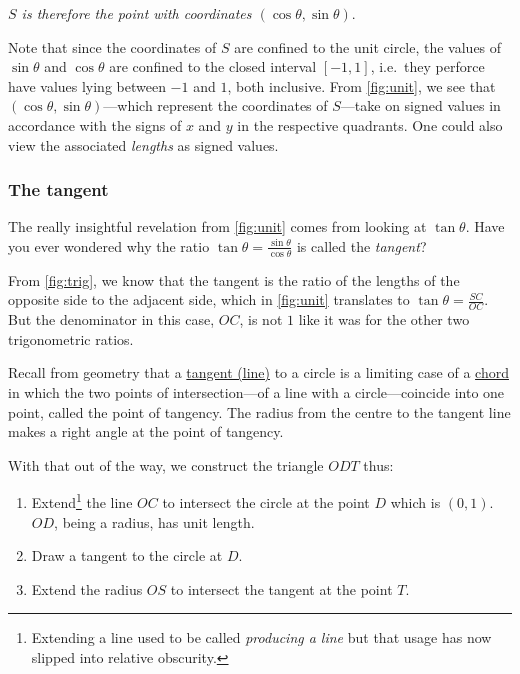 \documentclass[
  a4paper,
]{article}
\providecommand{\tightlist}{%
  \setlength{\itemsep}{0pt}\setlength{\parskip}{0pt}}
\begin{document}
\emph{\(S\) is therefore the point with coordinates
\((\cos\theta, \sin\theta)\)}.

Note that since the coordinates of \(S\) are confined to the unit
circle, the values of \(\sin\theta\) and \(\cos\theta\) are confined to
the closed interval \([-1, 1]\), i.e.~they perforce have values lying
between \(-1\) and \(1\), both inclusive. From \cref{fig:unit}, we see
that \((\cos\theta, \sin\theta)\)---which represent the coordinates of
\(S\)---take on signed values in accordance with the signs of \(x\) and
\(y\) in the respective quadrants. One could also view the associated
\emph{lengths} as signed values.

\hypertarget{the-tangent}{%
\subsubsection{The tangent}\label{the-tangent}}

The really insightful revelation from \cref{fig:unit} comes from looking
at \(\tan\theta\). Have you ever wondered why the ratio
\(\tan\theta = \frac{\sin\theta}{\cos\theta}\) is called the
\emph{tangent}?

From \cref{fig:trig}, we know that the tangent is the ratio of the
lengths of the opposite side to the adjacent side, which in
\cref{fig:unit} translates to \(\tan\theta = \frac{SC}{OC}\). But the
denominator in this case, \(OC\), is not \(1\) like it was for the other
two trigonometric ratios.

Recall from geometry that a
\href{https://en.wikipedia.org/wiki/Tangent_lines_to_circles}{tangent
(line)} to a circle is a limiting case of a
\href{https://en.wikipedia.org/wiki/Chord_(geometry)}{chord} in which
the two points of intersection---of a line with a circle---coincide into
one point, called the point of tangency. The radius from the centre to
the tangent line makes a right angle at the point of tangency.

With that out of the way, we construct the triangle \(ODT\) thus:

\begin{enumerate}
\def\labelenumi{\alph{enumi}.}
\tightlist
\item
  Extend\footnote{Extending a line used to be called \emph{producing a
    line} but that usage has now slipped into relative obscurity.} the
  line \(OC\) to intersect the circle at the point \(D\) which is
  \((0, 1)\). \(OD\), being a radius, has unit length.
\item
  Draw a tangent to the circle at \(D\).
\item
  Extend the radius \(OS\) to intersect the tangent at the point \(T\).
\end{enumerate}
\end{document}
